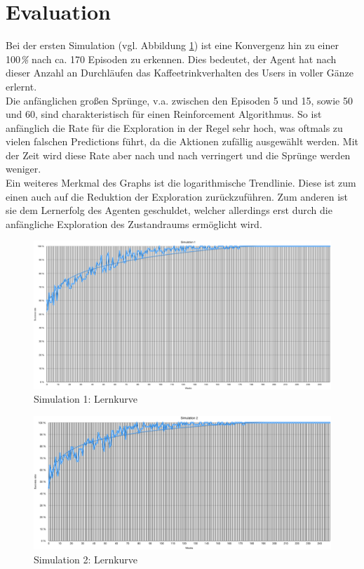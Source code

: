 \newpage
\section{Evaluation}

Bei der ersten Simulation (vgl. Abbildung \ref{img:sim1}) ist eine Konvergenz hin zu einer 100\textit{\%}  nach ca. 170 Episoden zu erkennen. Dies bedeutet, der Agent hat nach dieser Anzahl an Durchläufen das Kaffeetrinkverhalten des Users in voller Gänze erlernt. \\
Die anfänglichen großen Sprünge, v.a. zwischen den Episoden 5 und 15, sowie 50 und 60, sind charakteristisch für einen Reinforcement Algorithmus. So ist anfänglich die Rate für die Exploration in der Regel sehr hoch, was oftmals zu vielen falschen Predictions führt, da die Aktionen zufällig ausgewählt werden. Mit der Zeit wird diese Rate aber nach und nach verringert und die Sprünge werden weniger. \\
Ein weiteres Merkmal des Graphs ist die logarithmische Trendlinie. Diese ist zum einen auch auf die Reduktion der Exploration zurückzuführen. Zum anderen ist sie dem Lernerfolg des Agenten geschuldet, welcher allerdings erst durch die anfängliche Exploration des Zustandraums ermöglicht wird.


\begin{figure}[th!]
	\centering
	\includegraphics[width=.9\columnwidth]{./Abbildungen/Kapitel_04/sim1.png}
	\caption{Simulation 1: Lernkurve}
	\label{img:sim1}
\end{figure}


\begin{figure}[th!]
	\centering
	\includegraphics[width=.9\columnwidth]{./Abbildungen/Kapitel_04/sim2.png}
	\caption{Simulation 2: Lernkurve}
	\label{img:sim2}
\end{figure}


